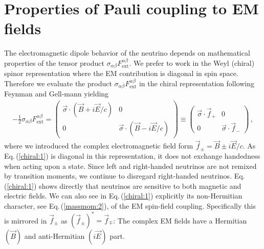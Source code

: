 \documentclass{ws-ijmpa}
\newcommand{\req}[1]{Eq.\,(\ref{#1})}
\begin{document}
\section{Properties of Pauli coupling to EM fields}
\label{sec:numoment}
The electromagnetic dipole behavior of the neutrino depends on mathematical properties of the tensor product $\sigma_{\alpha\beta}F^{\alpha\beta}_\mathrm{ext}$. We prefer to work in the Weyl (chiral) spinor representation where the EM contribution is diagonal in spin space. Therefore we evaluate the product $\sigma_{\alpha\beta}F^{\alpha\beta}_\mathrm{ext}$ in the chiral representation following Feynman and Gell-mann\cite{Feynman:1958ty} yielding
\begin{align}
\label{chiral:1}
-\frac{1}{2}\sigma_{\alpha\beta}F^{\alpha\beta}_\mathrm{ext}=
\begin{pmatrix}
\vec{\sigma}\cdot(\vec{B}+i\vec{E}/c) & 0\\
0 & \vec{\sigma}\cdot(\vec{B}-i\vec{E}/c)
\end{pmatrix}\equiv
\begin{pmatrix}
\vec{\sigma}\cdot\vec{f}_{+} & 0 \\
0 & \vec{\sigma}\cdot\vec{f}_{-}
\end{pmatrix}\,,
\end{align}
where we introduced the complex electromagnetic field form $\vec{f}_{\pm}=\vec{B}\pm i\vec{E}/c$. As \req{chiral:1} is diagonal in this representation, it does not exchange handedness when acting upon a state. Since left and right-handed neutrinos are not remixed by transition moments, we continue to disregard right-handed neutrinos. \req{chiral:1} shows directly that neutrinos are sensitive to both magnetic and electric fields. We can also see in \req{chiral:1} explicitly its non-Hermitian character, see \req{massmom:2}, of the EM spin-field coupling. Specifically this is mirrored in $\vec{f}_{\pm}$ as $(\vec{f}_{\pm})^{*}=\vec{f}_{\mp}$: The complex EM fields have a Hermitian $(\vec{B})$ and anti-Hermitian $(i\vec{E})$ part.
\end{document}
